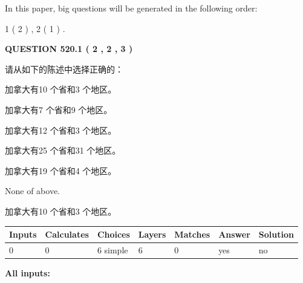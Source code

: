 \documentclass{ctexart}
\begin{document}
   
   
\vspace{0.2in}
   
In this paper, big questions will be generated in the following order: 
   
   
   1 ( 2 )
 ,
   2 ( 1 )
 .
  
\vspace{0.2in}
  
{\textbf{\Large{QUESTION
520.1 
 ( 2 , 2 , 3 )
}}}
  
  
请从如下的陈述中选择正确的：
 
 
加拿大有10 个省和3 个地区。
 
 
加拿大有7 个省和9 个地区。
 
 
加拿大有12 个省和3 个地区。
 
 
加拿大有25 个省和31 个地区。
 
 
加拿大有19 个省和4 个地区。
 
 
 None of above.
 
 
\noindent{}
 
 
加拿大有10 个省和3 个地区。
 
 
\noindent{}
 
 
   
   
   
   
\noindent\begin{tabular}{|l|l|l|l|l|l|l|}
 \hline
Inputs & Calculates & Choices & Layers & Matches & Answer & Solution \\ \hline
 0  & 
 0  & 
 6
  simple  
  & 
 6  & 
 0  & 
  yes & 
  no 
  \\ \hline
 \end{tabular}
   
   
   
   
\noindent{}
   
   
   
   
\noindent\vspace{0.1in}\hspace{-0.08in} {\textbf{\Large{All inputs: }}}
   
\end{document}
